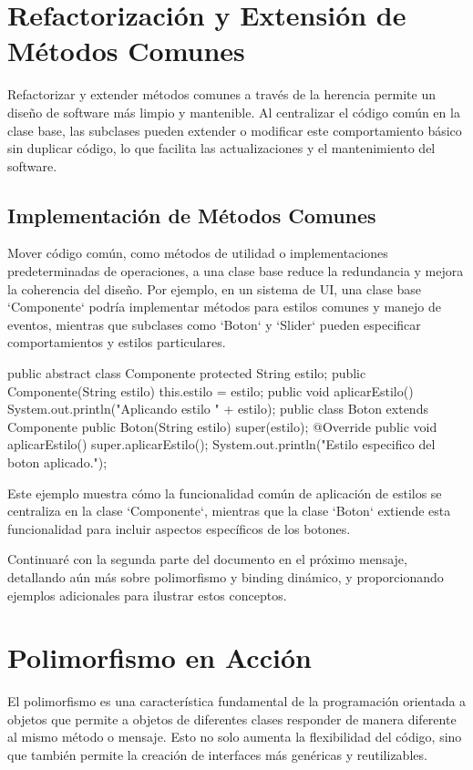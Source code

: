 \documentclass[a4paper]{report}
\begin{document}
\section{Refactorización y Extensión de Métodos Comunes}
Refactorizar y extender métodos comunes a través de la herencia permite un diseño de software más limpio y mantenible. Al centralizar el código común en la clase base, las subclases pueden extender o modificar este comportamiento básico sin duplicar código, lo que facilita las actualizaciones y el mantenimiento del software.

\subsection{Implementación de Métodos Comunes}
Mover código común, como métodos de utilidad o implementaciones predeterminadas de operaciones, a una clase base reduce la redundancia y mejora la coherencia del diseño. Por ejemplo, en un sistema de UI, una clase base `Componente` podría implementar métodos para estilos comunes y manejo de eventos, mientras que subclases como `Boton` y `Slider` pueden especificar comportamientos y estilos particulares.

\begin{roundedlst}
public abstract class Componente {
    protected String estilo;
    public Componente(String estilo) {
        this.estilo = estilo;
    }
    public void aplicarEstilo() {
        System.out.println("Aplicando estilo " + estilo);
    }
}
public class Boton extends Componente {
    public Boton(String estilo) {
        super(estilo);
    }
    @Override
    public void aplicarEstilo() {
        super.aplicarEstilo();
        System.out.println("Estilo especifico 
                           del boton aplicado.");
    }
}
\end{roundedlst}

Este ejemplo muestra cómo la funcionalidad común de aplicación de estilos se centraliza en la clase `Componente`, mientras que la clase `Boton` extiende esta funcionalidad para incluir aspectos específicos de los botones.

Continuaré con la segunda parte del documento en el próximo mensaje, detallando aún más sobre polimorfismo y binding dinámico, y proporcionando ejemplos adicionales para ilustrar estos conceptos.

\section{Polimorfismo en Acción}
El polimorfismo es una característica fundamental de la programación orientada a objetos que permite a objetos de diferentes clases responder de manera diferente al mismo método o mensaje. Esto no solo aumenta la flexibilidad del código, sino que también permite la creación de interfaces más genéricas y reutilizables.
\end{document}
